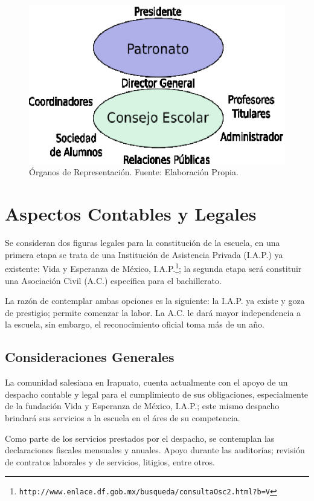 \begin{figure}[h]
	\centering
	\includegraphics{images/organos}
	\caption{Órganos de Representación. Fuente: Elaboración Propia.}
	\label{fig:Org:Organos}
\end{figure}
\clearpage

\section{Aspectos Contables y Legales}

Se consideran dos figuras legales para la constitución de la escuela, en una primera etapa se trata de una Institución de Asistencia Privada (I.A.P.) ya existente: Vida y Esperanza de México, I.A.P.\footnote{\texttt{http://www.enlace.df.gob.mx/busqueda/consultaOsc2.html?b=V}}; la segunda etapa será constituir una Asociación Civil (A.C.) específica para el bachillerato.

La razón de contemplar ambas opciones es la siguiente: la I.A.P. ya existe y goza de prestigio; permite comenzar la labor. La A.C. le dará mayor independencia a la escuela, sin embargo, el reconocimiento oficial toma más de un año.

\subsection{Consideraciones Generales}

La comunidad salesiana en Irapuato, cuenta actualmente con el apoyo de un despacho contable y legal para el cumplimiento de sus obligaciones, especialmente de la fundación Vida y Esperanza de México, I.A.P.; este mismo despacho brindará sus servicios a la escuela en el áres de su competencia.

Como parte de los servicios prestados por el despacho, se contemplan las declaraciones fiscales mensuales y anuales. Apoyo durante las auditorías; revisión de contratos laborales y de servicios, litigios, entre otros.

